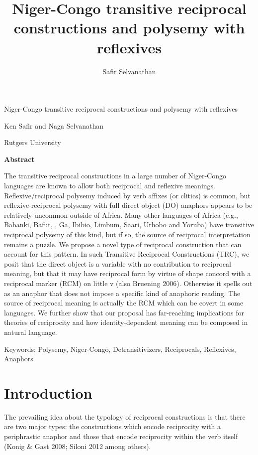 \documentclass[output=paper]{langsci/langscibook}
\title{Niger-Congo transitive reciprocal constructions and polysemy with reflexives}
\author{%
 Safir\affiliation{}\lastand 
 Selvanathan \affiliation{}
}
\begin{document}
\setcounter{page}{1}\begin{styleHeading}
Niger-Congo transitive reciprocal constructions and polysemy with reflexives
\end{styleHeading}

Ken Safir and Naga Selvanathan

Rutgers University 

\bfseries
Abstract

\begin{stylelsAbstract}
The transitive reciprocal constructions in a large number of Niger-Congo languages are known to allow both reciprocal and reflexive meanings. Reflexive/reciprocal polysemy induced by verb affixes (or clitics) is common, but reflexive-reciprocal polysemy with full direct object (DO) anaphors appears to be relatively uncommon outside of Africa. Many other languages of Africa (e.g., Babanki, Bafut, , Ga, Ibibio, Limbum, Saari, Urhobo and Yoruba) have transitive reciprocal polysemy of this kind, but if so, the source of reciprocal interpretation remains a puzzle. We propose a novel type of reciprocal construction that can account for this pattern. In such Transitive Reciprocal Constructions (TRC), we posit that the direct object is a variable with no contribution to reciprocal meaning, but that it may have reciprocal form by virtue of shape concord with a reciprocal marker (RCM) on little v (also Bruening 2006). Otherwise it spells out as an anaphor that does not impose a specific kind of anaphoric reading. The source of reciprocal meaning is actually the RCM which can be covert in some languages. We further show that our proposal has far-reaching implications for theories of reciprocity and how identity-dependent meaning can be composed in natural language. 
\end{stylelsAbstract}

Keywords: Polysemy, Niger-Congo, Detransitivizers, Reciprocals, Reflexives, Anaphors

\chapter{Introduction}

\textbf{  }The prevailing idea about the typology of reciprocal constructions is that there are two major types: the constructions which encode reciprocity with a periphrastic anaphor and those that encode reciprocity within the verb itself (Konig \& Gast 2008; Siloni 2012 among others).
\end{document}
